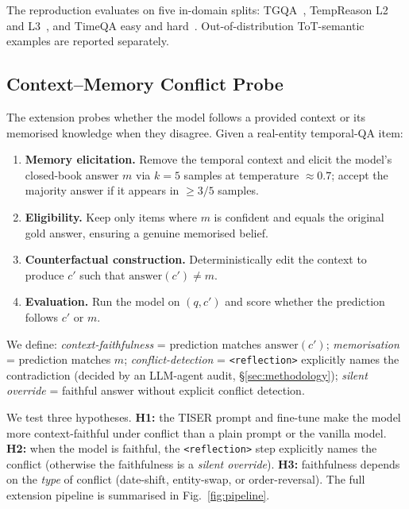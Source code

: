 \documentclass[conference]{IEEEtran}
\begin{document}
The reproduction evaluates on five in-domain splits: TGQA~\cite{xiong2024tgqa}, TempReason L2 and L3~\cite{tan2023tempreason}, and TimeQA easy and hard~\cite{chen2021timeqa}. Out-of-distribution ToT-semantic examples are reported separately.

\subsection{Context--Memory Conflict Probe}

The extension probes whether the model follows a provided context or its memorised knowledge when they disagree. Given a real-entity temporal-QA item:
\begin{enumerate}
\item \textbf{Memory elicitation.} Remove the temporal context and elicit the model's closed-book answer $m$ via $k{=}5$ samples at temperature ${\approx}0.7$; accept the majority answer if it appears in ${\geq}3/5$ samples.
\item \textbf{Eligibility.} Keep only items where $m$ is confident and equals the original gold answer, ensuring a genuine memorised belief.
\item \textbf{Counterfactual construction.} Deterministically edit the context to produce $c'$ such that $\text{answer}(c') \neq m$.
\item \textbf{Evaluation.} Run the model on $(q, c')$ and score whether the prediction follows $c'$ or $m$.
\end{enumerate}

We define:
\emph{context-faithfulness} = prediction matches $\text{answer}(c')$;
\emph{memorisation} = prediction matches $m$;
\emph{conflict-detection} = \texttt{<reflection>} explicitly names the contradiction (decided by an LLM-agent audit, \S\ref{sec:methodology});
\emph{silent override} = faithful answer without explicit conflict detection.

We test three hypotheses. \textbf{H1:} the TISER prompt and fine-tune make the model more context-faithful under conflict than a plain prompt or the vanilla model. \textbf{H2:} when the model is faithful, the \texttt{<reflection>} step explicitly names the conflict (otherwise the faithfulness is a \emph{silent override}). \textbf{H3:} faithfulness depends on the \emph{type} of conflict (date-shift, entity-swap, or order-reversal). The full extension pipeline is summarised in Fig.~\ref{fig:pipeline}.
\end{document}
